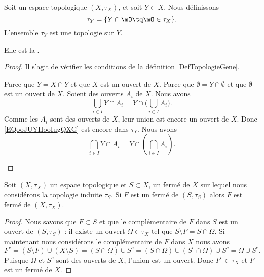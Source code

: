 \begin{propositionDef} \label{DefVLrgWDB}
	Soit un espace topologique \( (X, \tau_X) \), et soit \( Y \subset X \). Nous définissons
	\begin{equation}
		\tau_Y=\{ Y\cap\mO\tq \mO\in\tau_X \}.
	\end{equation}
	L'ensemble \( \tau_Y\) est une topologie sur \( Y\).

	Elle est la .
\end{propositionDef}

\begin{proof}
	Il s'agit de vérifier les conditions de la définition \ref{DefTopologieGene}.

	\begin{subproof}
		\spitem[\( Y\in \tau_Y\)]
		Parce que \( Y=X\cap Y\) et que \( X\) est un ouvert de \( X\).
		Parce que \( \emptyset = Y\cap\emptyset\) et que \( \emptyset\) est un ouvert de \( X\).
		Soient des ouverts \( A_i\) de \( X\). Nous avons
		\begin{equation}        \label{EQooJUYHooIugQXG}
			\bigcup_{i\in I}Y\cap A_i=Y\cap\big( \bigcup_{i\in I}A_i \big).
		\end{equation}
		Comme les \( A_i\) sont des ouverts de \( X\), leur union est encore un ouvert de \( X\). Donc \eqref{EQooJUYHooIugQXG} est encore dans \( \tau_Y\).
		Nous avons
		\begin{equation}
			\bigcap_{i\in I}Y\cap A_i=Y\cap\left( \bigcap_{i\in I}A_i \right).
		\end{equation}
	\end{subproof}
\end{proof}


\begin{lemma}        \label{LemBWSUooCCGvax}
	Soit \( (X,\tau_X)\) un espace topologique et \( S\subset X\), un fermé de \( X\) sur lequel nous considérons la topologie induite \( \tau_S\). Si \( F\) est un fermé de \( (S,\tau_S)\) alors \( F\) est fermé de \( (X,\tau_X)\).
\end{lemma}

\begin{proof}
	Nous savons que \( F\subset S\) et que le complémentaire de \( F\) dans \( S\) est un ouvert de \( (S,\tau_S)\) : il existe un ouvert \( \Omega\in \tau_X\) tel que \( S\setminus F=S\cap \Omega\). Si maintenant nous considérons le complémentaire de \( F\) dans \( X\) nous avons
	\begin{equation}
		F^c=(S\setminus F)\cup (X\setminus S)=(S\cap \Omega)\cup S^c=(S\cap \Omega)\cup(S^c\cap \Omega)\cup S^c=\Omega\cup S^c.
	\end{equation}
	Puisque \( \Omega\) et \( S^c\) sont des ouverts de \( X\), l'union est un ouvert. Donc \( F^c\in \tau_X\) et \( F\) est un fermé de \( X\).
\end{proof}

